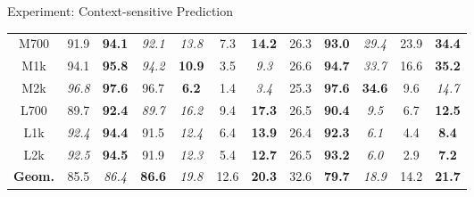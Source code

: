 \documentclass[first=dgreen,second=purple,logo=yellowexc]{aaltoslides}
\begin{document}
\begin{frame}{Experiment: Context-sensitive Prediction}
\begin{itemize}
\begin{table}[t]
\begin{tabular}{|@{ }c@{ }|@{}c@{ }c@{ }c@{}|@{}c@{ }c@{ }c@{}|@{}c@{ }c@{}|@{}c@{ }c@{ }c@{}|}
		M700  & {91.9} & \textbf{94.1} & \em{92.1} & \em{13.8} & {7.3} & \textbf{14.2}  & {26.3} & \textbf{93.0} & \em{29.4} & {23.9} & \textbf{34.4} \\ 
		M1k & {94.1} & \textbf{95.8} & \em{94.2} & \textbf{10.9} & {3.5} & \em{9.3}   & {26.6} & \textbf{94.7} & \em{33.7} & {16.6} & \textbf{35.2} \\ 
		M2k & \em{96.8} & \textbf{97.6} & {96.7} & \textbf{6.2} & {1.4} & \em{3.4}    & {25.3} & \textbf{97.6} & \textbf{34.6} & {9.6} & \em{14.7} \\ 
		L700  & {89.7} & \textbf{92.4} & \em{89.7} & \em{16.2} & {9.4} & \textbf{17.3}  & {26.5} & \textbf{90.4} & \em{9.5} & {6.7} & \textbf{12.5} \\ 
		L1k & \em{92.4} & \textbf{94.4} & {91.5} & \em{12.4} & {6.4} & \textbf{13.9}  & {26.4} & \textbf{92.3} & \em{6.1} & {4.4} & \textbf{8.4} \\ 
		L2k & \em{92.5} & \textbf{94.5} & {91.9} & \em{12.3} & {5.4} & \textbf{12.7}  & {26.5} & \textbf{93.2} & \em{6.0} & {2.9} & \textbf{7.2} \\ \hline
		\textbf{Geom.}  & {85.5} & \em{86.4} & \textbf{86.6} & \em{19.8} & {12.6} & \textbf{20.3} & {32.6} & \textbf{79.7} & \em{18.9} & {14.2} & \textbf{21.7} \\
		\hline
		\end{tabular}
		\label{table_global_res_svm}
		\end{table}
	\end{itemize}
\end{frame}
\end{document}
